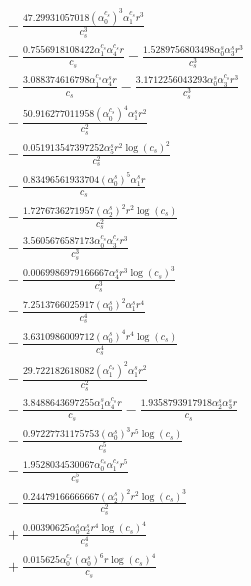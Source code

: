 \documentclass[10pt]{article}
\begin{document}
\begin{align*}
&{}  - \frac{47.29931057018 \left(\alpha_{0}^{c_s}\right)^{3} \alpha_{1}^{c_s} r^{3}}{c_{s}^{3}} \\
&{}  - \frac{0.7556918108422 \alpha_{1}^{c_s} \alpha_{4}^{c_s} r}{c_{s}} - \frac{1.5289756803498 \alpha_{0}^s \alpha_{3}^s r^{3}}{c_{s}^{3}} \\
&{}  - \frac{3.088374616798 \alpha_{1}^{c_s} \alpha_{4}^s r}{c_{s}} - \frac{3.1712256043293 \alpha_{0}^s \alpha_{3}^{c_s} r^{3}}{c_{s}^{3}} \\
&{}  - \frac{50.916277011958 \left(\alpha_{0}^{c_s}\right)^{4} \alpha_{1}^s r^{2}}{c_{s}^{2}} \\
&{}  - \frac{0.051913547397252 \alpha_{5}^s r^{2} \log{\left(c_{s} \right)}^{2}}{c_{s}^{2}} \\
&{}  - \frac{0.83496561933704 \left(\alpha_{0}^s\right)^{5} \alpha_{1}^s r}{c_{s}} \\
&{}  - \frac{1.7276736271957 \left(\alpha_{2}^s\right)^{2} r^{2} \log{\left(c_{s} \right)}}{c_{s}^{2}} \\
&{}  - \frac{3.5605676587173 \alpha_{0}^{c_s} \alpha_{3}^{c_s} r^{3}}{c_{s}^{3}} \\
&{}  - \frac{0.0069986979166667 \alpha_{4}^s r^{3} \log{\left(c_{s} \right)}^{3}}{c_{s}^{3}} \\
&{}  - \frac{7.2513766025917 \left(\alpha_{0}^s\right)^{2} \alpha_{1}^s r^{4}}{c_{s}^{4}} \\
&{}  - \frac{3.6310986009712 \left(\alpha_{0}^s\right)^{4} r^{4} \log{\left(c_{s} \right)}}{c_{s}^{4}} \\
&{}  - \frac{29.722182618082 \left(\alpha_{1}^{c_s}\right)^{2} \alpha_{1}^s r^{2}}{c_{s}^{2}} \\
&{}  - \frac{3.8488643697255 \alpha_{1}^s \alpha_{4}^{c_s} r}{c_{s}} - \frac{1.9358793917918 \alpha_{2}^s \alpha_{3}^s r}{c_{s}} \\
&{}  - \frac{0.97227731175753 \left(\alpha_{0}^s\right)^{3} r^{5} \log{\left(c_{s} \right)}}{c_{s}^{5}} \\
&{}  - \frac{1.9528034530067 \alpha_{0}^{c_s} \alpha_{1}^{c_s} r^{5}}{c_{s}^{5}} \\
&{}  - \frac{0.24479166666667 \left(\alpha_{2}^s\right)^{2} r^{2} \log{\left(c_{s} \right)}^{3}}{c_{s}^{2}} \\
&{}  + \frac{0.00390625 \alpha_{0}^s \alpha_{2}^s r^{4} \log{\left(c_{s} \right)}^{4}}{c_{s}^{4}} \\
&{}  + \frac{0.015625 \alpha_{0}^{c_s} \left(\alpha_{0}^s\right)^{6} r \log{\left(c_{s} \right)}^{4}}{c_{s}} \\

\end{align*}
\end{document}
